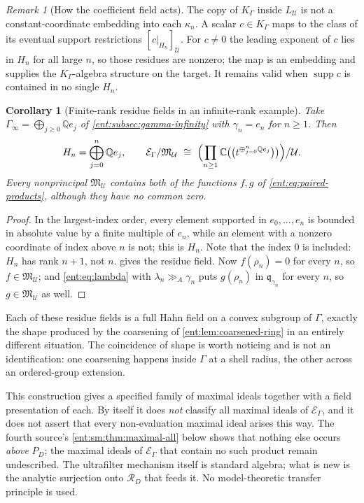 \documentclass[11pt]{article}
\theoremstyle{plain}
\theoremstyle{plain}
\theoremstyle{plain}
\newtheorem{corollary}[corollary]{Corollary}
\theoremstyle{definition}
\theoremstyle{definition}
\theoremstyle{definition}
\theoremstyle{definition}
\theoremstyle{remark}
\newtheorem{remark}[remark]{Remark}
\newcommand{\C}{\mathbb C}\newcommand{\R}{\mathbb R}
\newcommand{\Q}{\mathbb Q}\newcommand{\Z}{\mathbb Z}\newcommand{\N}{\mathbb N}
\newcommand{\K}{K_\Gamma}\newcommand{\KD}{K_\Delta}
\newcommand{\E}{\mathcal E_\Gamma}
\DeclareMathOperator{\supp}{supp}\DeclareMathOperator{\lc}{lc}
\newcommand{\RD}{\mathcal R_D}\newcommand{\Ucal}{\mathcal U}
\newcommand{\ggA}{\mathrel{\gg_{\!A}}}
\begin{document}
\begin{remark}[How the coefficient field acts]\label{ent:rem:coeff-action}
The copy of $\K$ inside $L_\Ucal$ is not a constant-coordinate embedding into
each $\kappa_n$. A scalar $c\in\K$ maps to the class of its eventual support
restrictions $[c|_{H_n}]_\Ucal$. For $c\ne0$ the leading exponent of $c$ lies
in $H_n$ for all large $n$, so those residues are nonzero; the map is an
embedding and supplies the $\K$-algebra structure on the target. It remains
valid when $\supp c$ is contained in no single $H_n$.
\end{remark}

\begin{corollary}[Finite-rank residue fields in an infinite-rank example]
\label{ent:cor:residue-fields}
Take $\Gamma_\infty=\bigoplus_{j\ge0}\Q e_j$ of
\cref{ent:subsec:gamma-infinity} with $\gamma_n=e_n$ for $n\ge1$. Then
\[
 H_n=\bigoplus_{j=0}^{n}\Q e_j,
 \qquad
 \E/\mathfrak M_\Ucal\ \cong\
 \Bigl(\prod_{n\ge1}
  \C\bigl(\bigl(t^{\oplus_{j=0}^{n}\Q e_j}\bigr)\bigr)\Bigr)\big/\Ucal .
\]
Every nonprincipal $\mathfrak M_\Ucal$ contains both of the functions $f,g$ of
\eqref{ent:eq:paired-products}, although they have no common zero.
\end{corollary}
\begin{proof}
In the largest-index order, every element supported in $e_0,\ldots,e_n$ is
bounded in absolute value by a finite multiple of $e_n$, while an element
with a nonzero coordinate of index above $n$ is not; this is $H_n$. Note that
the index $0$ is included: $H_n$ has rank $n+1$, not $n$.
 gives the residue field. Now $f(\rho_n)=0$ for every
$n$, so $f\in\mathfrak M_\Ucal$; and \eqref{ent:eq:lambda} with
$\lambda_n\ggA\gamma_n$ puts $g(\rho_n)$ in $\mathfrak q_{\gamma_n}$ for
every $n$, so $g\in\mathfrak M_\Ucal$ as well.
\end{proof}

Each of these residue fields is a full Hahn field on a convex subgroup of
$\Gamma$, exactly the shape produced by the coarsening of
\cref{ent:lem:coarsened-ring} in an entirely different situation. The
coincidence of shape is worth noticing and is not an identification: one
coarsening happens inside $\Gamma$ at a shell radius, the other across an
ordered-group extension.

This construction gives a specified family of maximal ideals together with a
field presentation of each. By itself it does \emph{not} classify all maximal
ideals of $\E$, and it does not assert that every non-evaluation maximal
ideal arises this way. The fourth source's
\cref{ent:sm:thm:maximal-all} below shows that nothing else occurs
\emph{above} $P_D$; the maximal ideals of $\E$ that contain no such product
remain undescribed. The ultrafilter mechanism itself is standard algebra;
what is new is the analytic surjection onto $\RD$ that feeds it. No
model-theoretic transfer principle is used.
\end{document}
